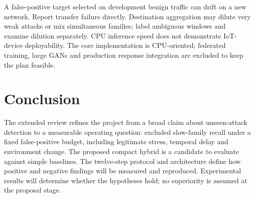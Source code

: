 \documentclass[conference]{IEEEtran}
\begin{document}
A false-positive target selected on development benign traffic can drift on a new network. Report transfer failure directly. Destination aggregation may dilute very weak attacks or mix simultaneous families; label ambiguous windows and examine dilution separately. CPU inference speed does not demonstrate IoT-device deployability. The core implementation is CPU-oriented; federated training, large GANs and production response integration are excluded to keep the plan feasible.

\section{Conclusion}
The extended review refines the project from a broad claim about unseen-attack detection to a measurable operating question: excluded slow-family recall under a fixed false-positive budget, including legitimate stress, temporal delay and environment change. The proposed compact hybrid is a candidate to evaluate against simple baselines. The twelve-step protocol and architecture define how positive and negative findings will be measured and reproduced. Experimental results will determine whether the hypotheses hold; no superiority is assumed at the proposal stage.
\end{document}
